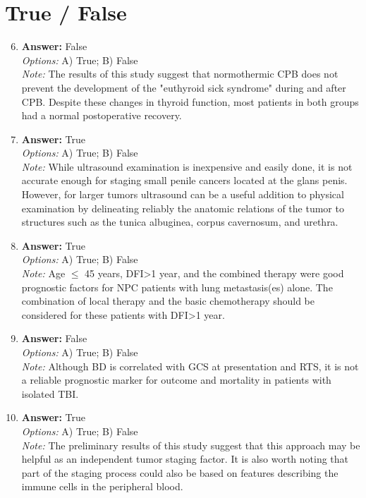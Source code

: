 \documentclass[12pt]{article}
\begin{document}
\section*{True / False}
\begin{enumerate}[label=\arabic*.]
\setcounter{enumi}{5}
\item \textbf{Answer:} False
\\ \textit{Options:} A) True; B) False
\\ \textit{Note:} The results of this study suggest that normothermic CPB does not prevent the development of the "euthyroid sick syndrome" during and after CPB. Despite these changes in thyroid function, most patients in both groups had a normal postoperative recovery.
\item \textbf{Answer:} True
\\ \textit{Options:} A) True; B) False
\\ \textit{Note:} While ultrasound examination is inexpensive and easily done, it is not accurate enough for staging small penile cancers located at the glans penis. However, for larger tumors ultrasound can be a useful addition to physical examination by delineating reliably the anatomic relations of the tumor to structures such as the tunica albuginea, corpus cavernosum, and urethra.
\item \textbf{Answer:} True
\\ \textit{Options:} A) True; B) False
\\ \textit{Note:} Age \ensuremath{\leq} 45 years, DFI\textgreater{}1 year, and the combined therapy were good prognostic factors for NPC patients with lung metastasis(es) alone. The combination of local therapy and the basic chemotherapy should be considered for these patients with DFI\textgreater{}1 year.
\item \textbf{Answer:} False
\\ \textit{Options:} A) True; B) False
\\ \textit{Note:} Although BD is correlated with GCS at presentation and RTS, it is not a reliable prognostic marker for outcome and mortality in patients with isolated TBI.
\item \textbf{Answer:} True
\\ \textit{Options:} A) True; B) False
\\ \textit{Note:} The preliminary results of this study suggest that this approach may be helpful as an independent tumor staging factor. It is also worth noting that part of the staging process could also be based on features describing the immune cells in the peripheral blood.
\end{enumerate}
\end{document}
